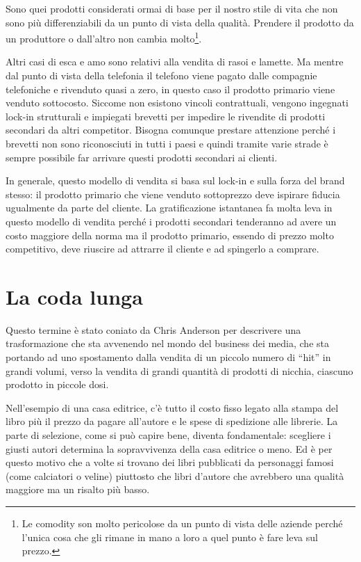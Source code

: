 \begin{definition}[Comodity]
Sono quei prodotti considerati ormai di base per il nostro stile di vita che
non sono più differenziabili da un punto di vista della qualità. Prendere il
prodotto da un produttore o dall'altro non cambia molto\footnote{Le comodity
son molto pericolose da un punto di vista delle aziende perché l'unica cosa che
gli rimane in mano a loro a quel punto è fare leva sul prezzo.}.
\end{definition}

\noindent Altri casi di esca e amo sono relativi alla vendita di rasoi e
lamette. Ma mentre dal punto di vista della telefonia il telefono viene pagato
dalle compagnie telefoniche e rivenduto quasi a zero, in questo caso il prodotto
primario viene venduto sottocosto. Siccome non esistono vincoli contrattuali,
vengono ingegnati lock-in strutturali e impiegati brevetti per
impedire le rivendite di prodotti secondari da altri competitor. Bisogna
comunque prestare attenzione perché i brevetti non sono riconosciuti in tutti i
paesi e quindi tramite varie strade è sempre possibile far arrivare questi
prodotti secondari ai clienti.

In generale, questo modello di vendita si basa sul lock-in e sulla forza del
brand stesso: il prodotto primario che viene venduto sottoprezzo deve ispirare
fiducia ugualmente da parte del cliente. La gratificazione istantanea fa molta
leva in questo modello di vendita perché i prodotti secondari tenderanno ad
avere un costo maggiore della norma ma il prodotto primario, essendo di prezzo
molto competitivo, deve riuscire ad attrarre il cliente e ad spingerlo a
comprare.

\section{La coda lunga}

Questo termine è stato coniato da Chris Anderson per descrivere una
trasformazione che sta avvenendo nel mondo del business dei media, che sta
portando ad uno spostamento dalla vendita di un piccolo numero di ``hit'' in
grandi volumi, verso la vendita di grandi quantità di prodotti di nicchia,
ciascuno prodotto in piccole dosi.

\begin{example}\label{ex:bi:ce}
Nell'esempio di una casa editrice, c'è tutto il costo fisso legato alla
stampa del libro più il prezzo da pagare all'autore e le spese di spedizione
alle librerie. La parte di selezione, come si può capire bene, diventa
fondamentale: scegliere i giusti autori determina la sopravvivenza della casa
editrice o meno. Ed è per questo motivo che a volte si trovano dei libri
pubblicati da personaggi famosi (come calciatori o veline) piuttosto che libri
d'autore che avrebbero una qualità maggiore ma un risalto più basso.
\end{example}

